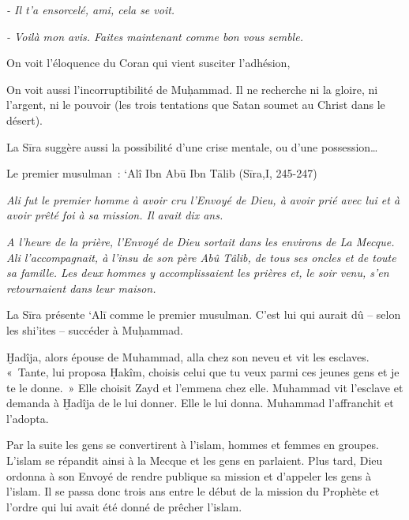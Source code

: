 \emph{- Il t'a ensorcelé, ami, cela se voit.}

\emph{- Voilà mon avis. Faites maintenant comme bon vous semble.}

On voit l'éloquence du Coran qui vient susciter l'adhésion,

On voit aussi l'incorruptibilité de Muḥammad. Il ne recherche ni la
gloire, ni l'argent, ni le pouvoir (les trois tentations que Satan
soumet au Christ dans le désert).

La Sīra suggère aussi la possibilité d'une crise mentale, ou d'une
possession\ldots{}


Le premier musulman~: `Alî Ibn Abū Ibn Tālib (Sīra,I, 245-247)

\emph{Ali fut le premier homme à avoir cru l'Envoyé de Dieu, à avoir
prié avec lui et à avoir prêté foi à sa mission. Il avait dix ans.}

\emph{A l'heure de la prière, l'Envoyé de Dieu sortait dans les environs
de La Mecque. Ali l'accompagnait, à l'insu de son père Abû Tâlib, de
tous ses oncles et de toute sa famille. Les deux hommes y
accomplissaient les prières et, le soir venu, s'en retournaient dans
leur maison.}

La Sīra présente `Alī comme le premier musulman. C'est lui qui aurait dû
-- selon les shi'ites -- succéder à Muḥammad.


Ḫadîja, alors épouse de Muhammad, alla chez son neveu et vit les
esclaves. «~Tante, lui proposa Ḥakîm, choisis celui que tu veux parmi
ces jeunes gens et je te le donne.~» Elle choisit Zayd et l'emmena chez
elle. Muhammad vit l'esclave et demanda à Ḫadîja de le lui donner. Elle
le lui donna. Muhammad l'affranchit et l'adopta.

Par la suite les gens se convertirent à l'islam, hommes et femmes en
groupes. L'islam se répandit ainsi à la Mecque et les gens en parlaient.
Plus tard, Dieu ordonna à son Envoyé de rendre publique sa mission et
d'appeler les gens à l'islam. Il se passa donc trois ans entre le début
de la mission du Prophète et l'ordre qui lui avait été donné de prêcher
l'islam.


